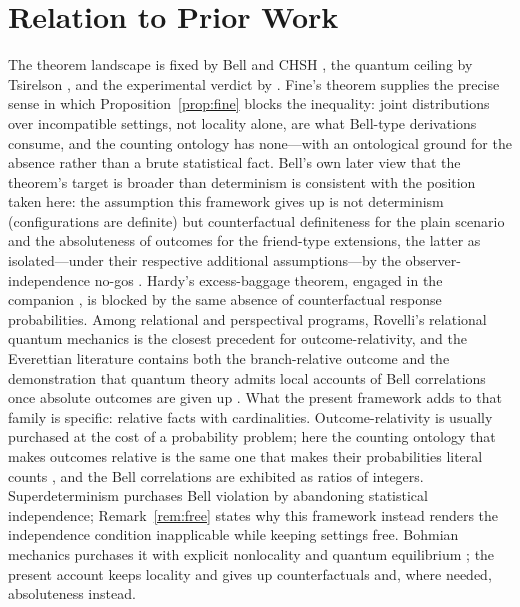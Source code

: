 \documentclass[11pt]{article}
\theoremstyle{definition}
\theoremstyle{remark}
\begin{document}
\section{Relation to Prior Work}\label{sec:related}
The theorem landscape is fixed by Bell \cite{Bell1964} and CHSH \cite{CHSH1969}, the quantum ceiling by Tsirelson \cite{Tsirelson1980}, and the experimental verdict by \cite{Aspect1982,Hensen2015}. Fine's theorem \cite{Fine1982} supplies the precise sense in which Proposition~\ref{prop:fine} blocks the inequality: joint distributions over incompatible settings, not locality alone, are what Bell-type derivations consume, and the counting ontology has none---with an ontological ground for the absence rather than a brute statistical fact. Bell's own later view that the theorem's target is broader than determinism \cite{Bell1981,BrownTimpson2016} is consistent with the position taken here: the assumption this framework gives up is not determinism (configurations are definite) but counterfactual definiteness for the plain scenario and the absoluteness of outcomes for the friend-type extensions, the latter as isolated---under their respective additional assumptions---by the observer-independence no-gos \cite{Brukner2018,FrauchigerRenner2018,Bong2020}. Hardy's excess-baggage theorem, engaged in the companion \cite{TillittBorn}, is blocked by the same absence of counterfactual response probabilities. Among relational and perspectival programs, Rovelli's relational quantum mechanics \cite{Rovelli1996,DiBiagio2021} is the closest precedent for outcome-relativity, and the Everettian literature contains both the branch-relative outcome \cite{Wallace2012} and the demonstration that quantum theory admits local accounts of Bell correlations once absolute outcomes are given up \cite{DeutschHayden2000,WallaceTimpson2010}. What the present framework adds to that family is specific: relative facts with cardinalities. Outcome-relativity is usually purchased at the cost of a probability problem; here the counting ontology that makes outcomes relative is the same one that makes their probabilities literal counts \cite{TillittBorn}, and the Bell correlations are exhibited as ratios of integers. Superdeterminism \cite{tHooft2016} purchases Bell violation by abandoning statistical independence; Remark~\ref{rem:free} states why this framework instead renders the independence condition inapplicable while keeping settings free. Bohmian mechanics purchases it with explicit nonlocality and quantum equilibrium \cite{Durr1992}; the present account keeps locality and gives up counterfactuals and, where needed, absoluteness instead.
\end{document}
